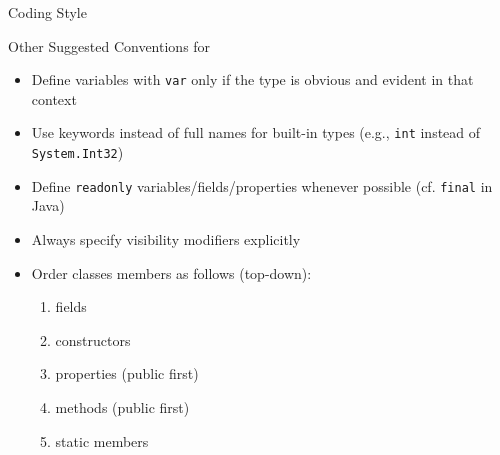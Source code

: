 \documentclass[presentation]{beamer}
\begin{document}
\begin{frame}{\csharp Coding Style}
    \begin{exampleblock}{Other Suggested Conventions for \csharp}
        \begin{itemize}
            \item Define variables with \alert{\texttt{var}} only if the type is \alert{obvious and evident} in that context
            \item Use keywords instead of full names for built-in types (e.g., \lstinline|int| instead of \lstinline|System.Int32|)
            \item Define \alert{\texttt{readonly}} variables/fields/properties whenever possible (cf. \lstinline|final| in Java)
            \item Always specify visibility modifiers explicitly
            \item Order classes members as follows (top-down):
            \begin{enumerate}
                \item fields
                \item constructors
                \item properties (public first)
                \item methods (public first)
                \item static members
            \end{enumerate}
        \end{itemize}
    \end{exampleblock}


\end{frame}
\end{document}
